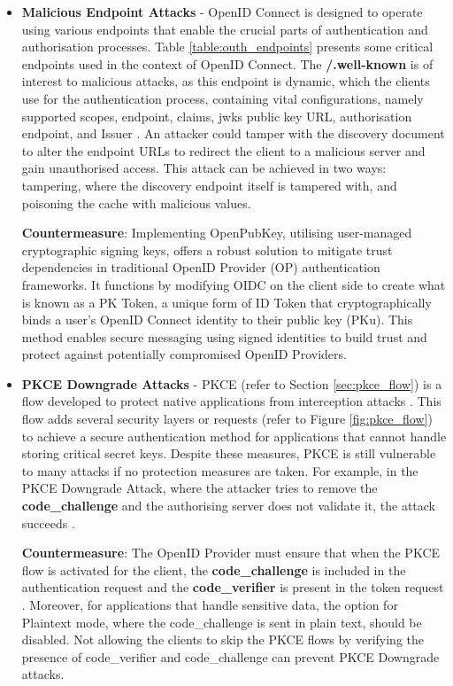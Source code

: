 \begin{itemize}
    \item \textbf{Malicious Endpoint Attacks} - OpenID Connect is designed to operate using various endpoints that enable the crucial parts of authentication and authorisation processes. Table \ref{table:outh_endpoints} presents some critical endpoints used in the context of OpenID Connect. The \textbf{/.well-known} is of interest to malicious attacks, as this endpoint is dynamic, which the clients use for the authentication process, containing vital configurations, namely supported scopes, endpoint, claims, jwks public key URL, authorisation endpoint, and Issuer \citep{oidc_attacks}. An attacker could tamper with the discovery document to alter the endpoint URLs to redirect the client to a malicious server and gain unauthorised access. This attack can be achieved in two ways: tampering, where the discovery endpoint itself is tampered with, and poisoning the cache with malicious values.\newline

    \textbf{Countermeasure}: Implementing OpenPubKey, utilising user-managed cryptographic signing keys, offers a robust solution to mitigate trust dependencies in traditional OpenID Provider (OP) authentication frameworks.  It functions by modifying OIDC on the client side to create what is known as a PK Token, a unique form of ID Token that cryptographically binds a user's OpenID Connect identity to their public key (PKu)\citep{openpub_key}. This method enables secure messaging using signed identities to build trust and protect against potentially compromised OpenID Providers.


    \item \textbf{PKCE Downgrade Attacks} - PKCE (refer to Section \ref{sec:pkce_flow}) is a flow developed to protect native applications from interception attacks \citep{pkce}. This flow adds several security layers or requests (refer to Figure \ref{fig:pkce_flow}) to achieve a secure authentication method for applications that cannot handle storing critical secret keys. Despite these measures, PKCE is still vulnerable to many attacks if no protection measures are taken. For example, in the PKCE Downgrade Attack, where the attacker tries to remove the \textbf{code\_challenge} and the authorising server does not validate it, the attack succeeds \citep{oidc_attacks}.\newline

    \textbf{Countermeasure}: The OpenID Provider must ensure that when the PKCE flow is activated for the client, the \textbf{code\_challenge} is included in the authentication request and the \textbf{code\_verifier} is present in the token request \citep{oidc_attacks}. Moreover, for applications that handle sensitive data, the option for Plaintext mode, where the code\_challenge is sent in plain text, should be disabled. Not allowing the clients to skip the PKCE flows by verifying the presence of code\_verifier and code\_challenge can prevent PKCE Downgrade attacks. \newline



\end{itemize}
